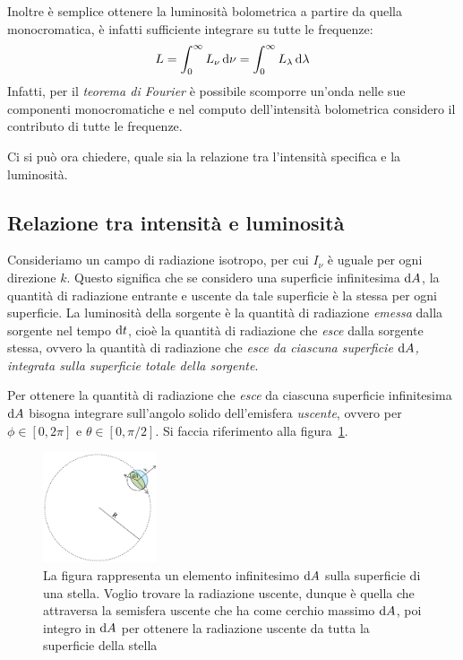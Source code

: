 Inoltre è semplice ottenere la luminosità bolometrica a partire da quella monocromatica, è infatti sufficiente integrare su tutte le frequenze:
\begin{equation}\label{eq:luminosità-bolometrica}
    L = \int_0^\infty L_\nu \mathop{}\!\mathrm{d} \nu = \int_0^\infty L_\lambda \mathop{}\!\mathrm{d} \lambda
\end{equation}
Infatti, per il \emph{teorema di Fourier} è possibile scomporre un'onda nelle sue componenti monocromatiche e nel computo dell'intensità bolometrica considero il contributo di tutte le frequenze.

Ci si può ora chiedere, quale sia la relazione tra l'intensità specifica e la luminosità.

\subsection{Relazione tra intensità e luminosità}\label{sec:relazione-intensità-luminosità}
Consideriamo un campo di radiazione isotropo, per cui $I_\nu$ è uguale per ogni direzione $k$. Questo significa che se considero una superficie infinitesima $\mathop{}\!\mathrm{d} A$, la quantità di radiazione entrante e uscente da tale superficie è la stessa per ogni superficie. La luminosità della sorgente è la quantità di radiazione \emph{emessa} dalla sorgente nel tempo $\mathop{}\!\mathrm{d} t$, cioè la quantità di radiazione che \emph{esce} dalla sorgente stessa, ovvero la quantità di radiazione che \emph{esce da ciascuna superficie $\mathop{}\!\mathrm{d} A$, integrata sulla superficie totale della sorgente}.

Per ottenere la quantità di radiazione che \emph{esce} da ciascuna superficie infinitesima $\mathop{}\!\mathrm{d} A$ bisogna integrare sull'angolo solido dell'emisfera \emph{uscente}, ovvero per $\phi \in [0, 2\pi]$ e $\theta \in [0, \pi/2]$. Si faccia riferimento alla figura~\ref{fig:emisfera-uscente}.

\begin{figure}
\centering
\includegraphics[width=0.3\textwidth]{immagini/emisfera-uscente.png}
\caption{La figura rappresenta un elemento infinitesimo $\mathop{}\!\mathrm{d} A$ sulla superficie di una stella. Voglio trovare la radiazione uscente, dunque è quella che attraversa la semisfera uscente che ha come cerchio massimo $\mathop{}\!\mathrm{d} A$, poi integro in $\mathop{}\!\mathrm{d} A$ per ottenere la radiazione uscente da tutta la superficie della stella}
\label{fig:emisfera-uscente}
\end{figure}

